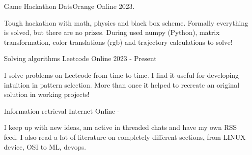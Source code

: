 


\begin{cventries}


\cventry
{Game Hackathon} %
{DatsOrange} %
{Online} %
{2023.} %
{ %
\begin{cvitems}
\item { Tough hackathon with math, physics and black box scheme. Formally everything is solved, but there are no prizes. During used numpy (Python), matrix transformation, color translations (rgb) and trajectory calculations to solve! }
\end{cvitems}
}


\cventry
{Solving algorithms} %
{Leetcode} %
{Online} %
{2023 - Present} %
{ %
\begin{cvitems}
\item { I solve problems on Leetcode from time to time. I find it useful for developing intuition in pattern selection. More than once it helped to recreate an original solution in working projects! } 
\end{cvitems}
}


\cventry
{Information retrieval} %
{Internet} %
{Online} %
{-} %
{ %
\begin{cvitems}
\item { I keep up with new ideas, am active in threaded chats and have my own RSS feed. I also read a lot of literature on completely different sections, from LINUX device, OSI to ML, devops. } 
\end{cvitems}
}



\end{cventries}